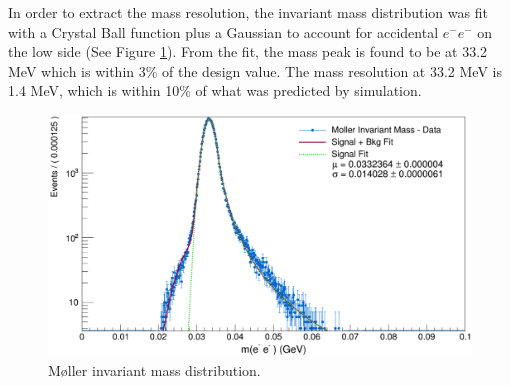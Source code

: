 In order to extract the mass resolution, the invariant mass distribution was 
fit with a Crystal Ball function \cite{Gaiser:1982yw} 
%
plus a Gaussian to account for accidental 
$e^-e^-$ on the low side (See Figure \ref{fig:moller_mass}).  From the 
fit, the mass peak is found to be at 33.2 MeV which is within 3\% of the design
value.  The mass resolution at 33.2 MeV is 1.4 MeV, which is within 10\% of what
was predicted by simulation.
\begin{figure}[h!t]
    \centering
    \includegraphics[width=\textwidth]{images/moller_invariant_mass.png}
    \caption{M\o ller invariant mass distribution.}
    \label{fig:moller_mass}
\end{figure}

